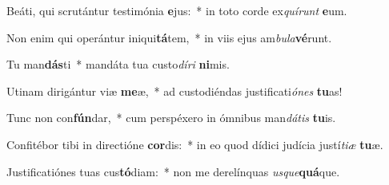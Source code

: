 \item Beáti, qui scrutántur testimónia \textbf{e}jus:~* in toto corde ex\textit{quí}\textit{runt} \textbf{e}um.
\item Non enim qui operántur iniqui\textbf{tá}tem,~* in viis ejus am\textit{bu}\textit{la}\textbf{vé}runt.
\item Tu man\textbf{dás}ti~* mandáta tua custo\textit{dí}\textit{ri} \textbf{ni}mis.
\item Utinam dirigántur viæ \textbf{me}æ,~* ad custodiéndas justificati\textit{ó}\textit{nes} \textbf{tu}as!
\item Tunc non con\textbf{fún}dar,~* cum perspéxero in ómnibus man\textit{dá}\textit{tis} \textbf{tu}is.
\item Confitébor tibi in directióne \textbf{cor}dis:~* in eo quod dídici judícia justí\textit{ti}\textit{æ} \textbf{tu}æ.
\item Justificatiónes tuas cus\textbf{tó}diam:~* non me derelínquas \textit{us}\textit{que}\textbf{quá}que.
